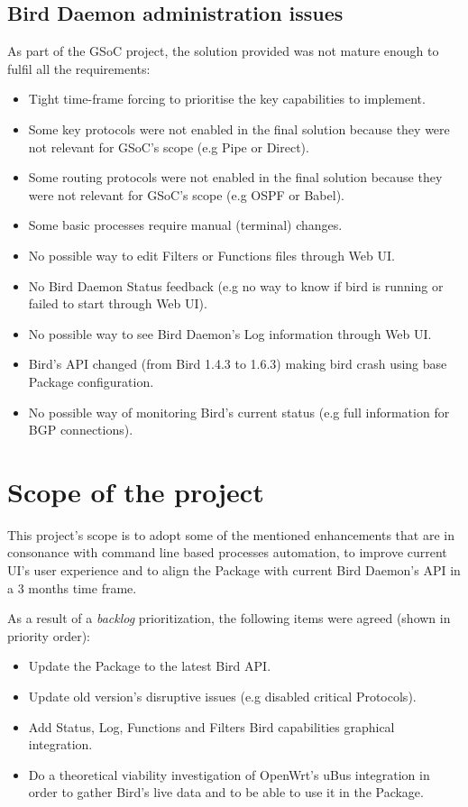 \subsection{Bird Daemon administration issues}
\label{subsec:bdai}
As part of the GSoC project, the solution provided was not mature enough to fulfil all the requirements:
\begin{itemize}
    \item Tight time-frame forcing to prioritise the key capabilities to implement.
    \item Some key protocols were not enabled in the final solution because they were not relevant for GSoC's scope (e.g Pipe or Direct).
    \item Some routing protocols were not enabled in the final solution because they were not relevant for GSoC's scope (e.g OSPF or Babel).
    \item Some basic processes require manual (terminal) changes.
    \item No possible way to edit Filters or Functions files through Web UI.
    \item No Bird Daemon Status feedback (e.g no way to know if bird is running or failed to start through Web UI).
    \item No possible way to see Bird Daemon's Log information through Web UI.
    \item Bird's API changed (from Bird 1.4.3 to 1.6.3) making bird crash using base Package configuration.
    \item No possible way of monitoring Bird's current status (e.g full information for BGP connections).
\end{itemize}


\section{Scope of the project}
\label{sec:sotp}
This project's scope is to adopt some of the mentioned enhancements that are in consonance with command line based processes automation, to improve current UI's user experience and to align the Package with current Bird Daemon's API in a 3 months time frame.

As a result of a \textit{backlog} prioritization, the following items were agreed (shown in priority order):
\begin{itemize}
    \item Update the Package to the latest Bird API.
    \item Update old version's disruptive issues (e.g disabled critical Protocols).
    \item Add Status, Log, Functions and Filters Bird capabilities graphical integration.
    \item Do a theoretical viability investigation of OpenWrt's uBus integration in order to gather Bird's live data and to be able to use it in the Package.
\end{itemize}


